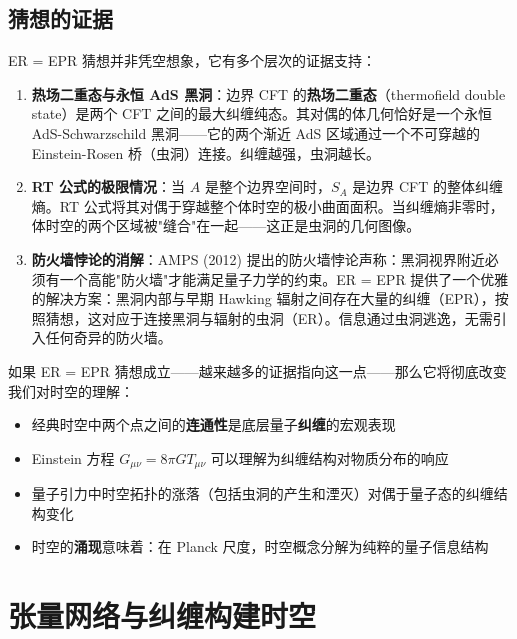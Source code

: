 \subsection{猜想的证据}

ER = EPR 猜想并非凭空想象，它有多个层次的证据支持：

\begin{enumerate}
    \item \textbf{热场二重态与永恒 AdS 黑洞}：边界 CFT 的\textbf{热场二重态}（thermofield double state）是两个 CFT 之间的最大纠缠纯态。其对偶的体几何恰好是一个永恒 AdS-Schwarzschild 黑洞——它的两个渐近 AdS 区域通过一个不可穿越的 Einstein-Rosen 桥（虫洞）连接。纠缠越强，虫洞越长。
    
    \item \textbf{RT 公式的极限情况}：当 $A$ 是整个边界空间时，$S_A$ 是边界 CFT 的整体纠缠熵。RT 公式将其对偶于穿越整个体时空的极小曲面面积。当纠缠熵非零时，体时空的两个区域被"缝合"在一起——这正是虫洞的几何图像。
    
    \item \textbf{防火墙悖论的消解}：AMPS (2012) 提出的防火墙悖论声称：黑洞视界附近必须有一个高能"防火墙"才能满足量子力学的约束。ER = EPR 提供了一个优雅的解决方案：黑洞内部与早期 Hawking 辐射之间存在大量的纠缠（EPR），按照猜想，这对应于连接黑洞与辐射的虫洞（ER）。信息通过虫洞逃逸，无需引入任何奇异的防火墙。
\end{enumerate}

\begin{note}
    如果 ER = EPR 猜想成立——越来越多的证据指向这一点——那么它将彻底改变我们对时空的理解：
    \begin{itemize}
        \item 经典时空中两个点之间的\textbf{连通性}是底层量子\textbf{纠缠}的宏观表现
        \item Einstein 方程 $G_{\mu\nu} = 8\pi G T_{\mu\nu}$ 可以理解为纠缠结构对物质分布的响应
        \item 量子引力中时空拓扑的涨落（包括虫洞的产生和湮灭）对偶于量子态的纠缠结构变化
        \item 时空的\textbf{涌现}意味着：在 Planck 尺度，时空概念分解为纯粹的量子信息结构
    \end{itemize}
\end{note}

\section{张量网络与纠缠构建时空}

